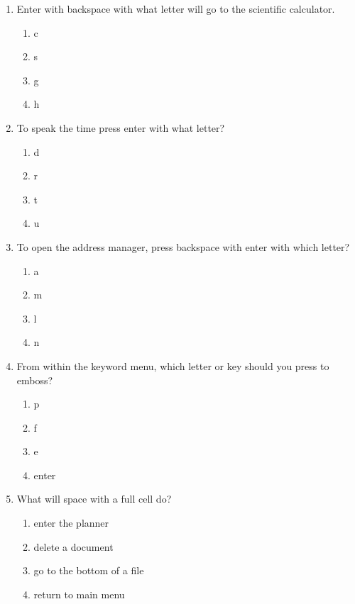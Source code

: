 \documentclass[10pt,letterpaper,twoside]{report}
\begin{document}
{{{\begin{enumerate}
\begin{enumerate}
		      \item skip to the end of the file
	      \end{enumerate}
	\item Enter with backspace with what letter will go to the scientific calculator.
	      \begin{enumerate}
		      \item c
		      \item s
		      \item g
		      \item h
	      \end{enumerate}
	\item To speak the time press enter with what letter?
	      \begin{enumerate}
		      \item d
		      \item r
		      \item t
		      \item u
	      \end{enumerate}
	\item To open the address manager, press backspace with enter with which letter?
	      \begin{enumerate}
		      \item a
		      \item m
		      \item l
		      \item n
	      \end{enumerate}
	\item From within the keyword menu, which letter or key should you press to emboss?
	      \begin{enumerate}
		      \item p
		      \item f
		      \item e
		      \item enter
	      \end{enumerate}
	\item What will space with a full cell do?
	      \begin{enumerate}
		      \item enter the planner
		      \item delete a document
		      \item go to the bottom of a file
		      \item return to main menu
	      \end{enumerate}
\end{enumerate}
\clearpage
}}}
\end{document}
